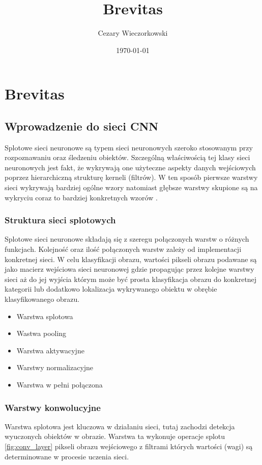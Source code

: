 \documentclass[../main.tex]{subfiles}
\author{Cezary Wieczorkowski}
\date{\today}
\title{Brevitas}
\begin{document}
\section{Brevitas}

\subsection{Wprowadzenie do sieci CNN}

Splotowe sieci neuronowe są typem sieci neuronowych szeroko stosowanym przy rozpoznawaniu oraz śledzeniu obiektów. Szczególną właściwością tej
klasy sieci neuronowych jest fakt, że wykrywają one użyteczne aspekty danych wejściowych poprzez hierarchiczną strukturę kerneli (filtrów). W ten sposób pierwsze warstwy sieci
wykrywają bardziej ogólne wzory natomiast głębsze warstwy skupione są na wykryciu coraz to bardziej konkretnych wzorów \cite{presentation_cnn}.

\subsubsection{Struktura sieci splotowych}

Splotowe sieci neuronowe składają się z szeregu połączonych warstw o różnych funkcjach. Kolejność oraz ilość połączonych warstw zależy od implementacji konkretnej sieci.
W celu klasyfikacji obrazu, wartości pikseli obrazu podawane są jako macierz wejściowa sieci neuronowej gdzie propagując przez kolejne warstwy sieci aż do jej wyjścia którym może być prosta klasyfikacja obrazu do konkretnej
kategorii lub dodatkowo lokalizacja wykrywanego obiektu w obrębie klasyfikowanego obrazu.

\begin{itemize}
    \item Warstwa splotowa
    \item Wastwa pooling
    \item Warstwa aktywacyjne
    \item Warstwy normalizacyjne
    \item Warstwa w pełni połączona
\end{itemize}

\subsubsection{Warstwy konwolucyjne}

Warstwa splotowa jest kluczowa w działaniu sieci, tutaj zachodzi detekcja wyuczonych obiektów w obrazie. Warstwa ta wykonuje operacje splotu \ref{fig:conv_layer} pikseli obrazu wejściowego z filtrami których wartości (wagi) są determinowane w procesie 
uczenia sieci.
\end{document}
